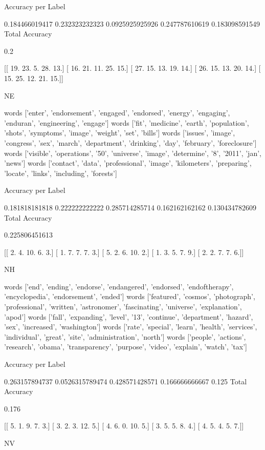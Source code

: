 \documentclass[11pt]{article}
\begin{document}
\begin{verbatium}
Accuracy per Label

0.184466019417
0.232323232323
0.0925925925926
0.247787610619
0.183098591549
Total Accuracy

0.2


[[ 19.  23.   5.  28.  13.]
 [ 16.  21.  11.  25.  15.]
 [ 27.  15.  13.  19.  14.]
 [ 26.  15.  13.  20.  14.]
 [ 15.  25.  12.  21.  15.]]


NE


words
['enter', 'endorsement', 'engaged', 'endorsed', 'energy', 'engaging', 'enduran', 'engineering', 'engage']
words
['fit', 'medicine', 'earth', 'population', 'shots', 'symptoms', 'image', 'weight', 'set', 'bills']
words
['issues', 'image', 'congress', 'sex', 'march', 'department', 'drinking', 'day', 'february', 'foreclosure']
words
['visible', 'operations', '50', 'universe', 'image', 'determine', '8', '2011', 'jan', 'news']
words
['contact', 'data', 'professional', 'image', 'kilometers', 'preparing', 'locate', 'links', 'including', 'forests']

Accuracy per Label

0.181818181818
0.222222222222
0.285714285714
0.162162162162
0.130434782609
Total Accuracy

0.225806451613


[[  2.   4.  10.   6.   3.]
 [  1.   7.   7.   7.   3.]
 [  5.   2.   6.  10.   2.]
 [  1.   3.   5.   7.   9.]
 [  2.   2.   7.   7.   6.]]


NH


words
['end', 'ending', 'endorse', 'endangered', 'endorsed', 'endoftherapy', 'encyclopedia', 'endorsement', 'ended']
words
['featured', 'cosmos', 'photograph', 'professional', 'written', 'astronomer', 'fascinating', 'universe', 'explanation', 'apod']
words
['fall', 'expanding', 'level', '13', 'continue', 'department', 'hazard', 'sex', 'increased', 'washington']
words
['rate', 'special', 'learn', 'health', 'services', 'individual', 'great', 'site', 'administration', 'north']
words
['people', 'actions', 'research', 'obama', 'transparency', 'purpose', 'video', 'explain', 'watch', 'tax']

Accuracy per Label

0.263157894737
0.0526315789474
0.428571428571
0.166666666667
0.125
Total Accuracy

0.176


[[  5.   1.   9.   7.   3.]
 [  3.   2.   3.  12.   5.]
 [  4.   6.   0.  10.   5.]
 [  3.   5.   5.   8.   4.]
 [  4.   5.   4.   5.   7.]]


NV



\end{verbatium}
\end{document}
